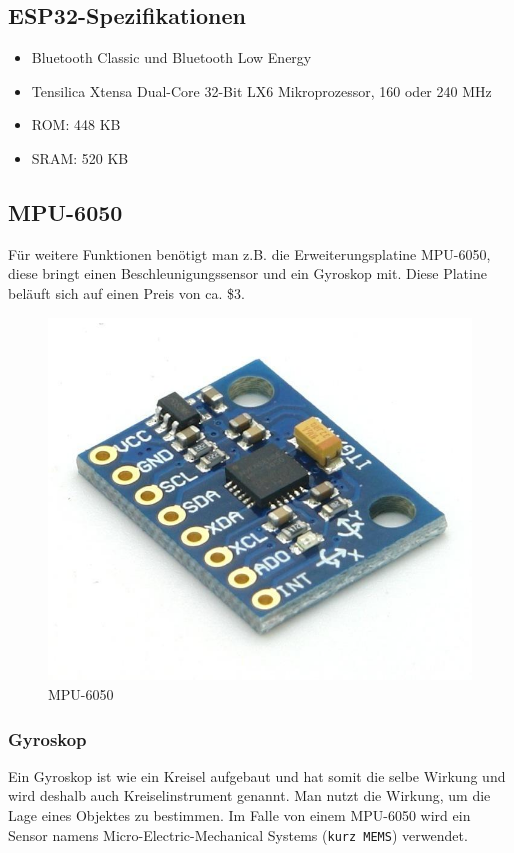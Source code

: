 \subsection{ESP32-Spezifikationen}

\begin{itemize}
	\item Bluetooth Classic und Bluetooth Low Energy
	\item Tensilica Xtensa Dual-Core 32-Bit LX6 Mikroprozessor, 160 oder 240 MHz
	\item ROM:  448 KB
	\item SRAM:  520 KB 
\end{itemize}

\subsection{MPU-6050}

Für weitere Funktionen benötigt man z.B. die Erweiterungsplatine MPU-6050, diese bringt einen Beschleunigungssensor und ein Gyroskop mit. Diese Platine beläuft sich auf einen Preis von ca. \$3.

\begin{figure}[H]
	\centering
	\includegraphics[width=0.7\linewidth]{images/MPU6050.jpg}
	\caption[MPU6050]{MPU-6050}
	\label{fig:MPU6050}
\end{figure}

\newpage
\subsubsection{Gyroskop}

Ein Gyroskop ist wie ein Kreisel aufgebaut und hat somit die selbe Wirkung und wird deshalb auch Kreiselinstrument genannt. Man nutzt die Wirkung, um die Lage eines Objektes zu bestimmen. Im Falle von einem MPU-6050 wird ein Sensor namens Micro-Electric-Mechanical Systems (\texttt{kurz MEMS}) verwendet. 


